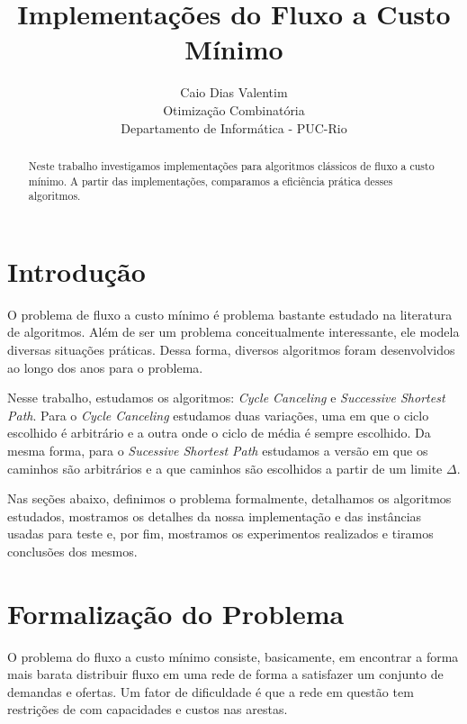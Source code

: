 \documentclass[12pt]{article}
\begin{document}
\nocite{*}

\title{Implementações do Fluxo a Custo Mínimo}

\author{Caio Dias Valentim \\ 
Otimização Combinatória \\
Departamento de Informática - PUC-Rio \\
}

\maketitle

\begin{abstract}
	Neste trabalho investigamos implementações para algoritmos 
	clássicos de fluxo a custo mínimo. A partir das implementações, 
	comparamos a eficiência prática desses algoritmos.
\end{abstract}


\section{Introdução}

O problema de fluxo a custo mínimo é problema bastante estudado na literatura de algoritmos.
Além de ser um problema conceitualmente interessante, ele modela diversas situações práticas.
Dessa forma, diversos algoritmos foram desenvolvidos ao longo dos anos para o problema.

Nesse trabalho, estudamos os algoritmos: \emph{Cycle Canceling} e \emph{Successive Shortest Path}. 
Para o \emph{Cycle Canceling} estudamos duas variações, uma em que o ciclo escolhido é arbitrário e
a outra onde o ciclo de média é sempre escolhido. Da mesma forma, para o \emph{Sucessive Shortest Path} 
estudamos a versão em que os caminhos são arbitrários e a que caminhos são escolhidos a partir de um 
limite $\Delta$.

Nas seções abaixo, definimos o problema formalmente, detalhamos os algoritmos estudados, mostramos
os detalhes da nossa implementação e das instâncias usadas para teste e, por fim, mostramos os experimentos
realizados e tiramos conclusões dos mesmos.

\section{Formalização do Problema}
O problema do fluxo a custo mínimo consiste, basicamente, em encontrar a forma mais barata
distribuir fluxo em uma rede de forma a satisfazer um conjunto de demandas e ofertas.
Um fator de dificuldade é que a rede em questão tem restrições de com capacidades e custos nas arestas.
\end{document}
